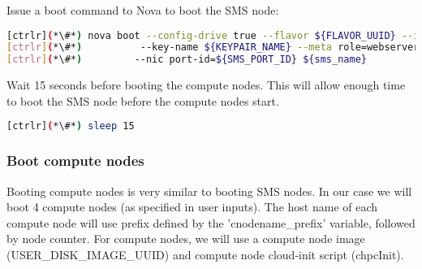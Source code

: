 	Issue a boot command to Nova to boot the SMS node:


\begin{lstlisting}[language=bash,keywords={}]
[ctrlr](*\#*) nova boot --config-drive true --flavor ${FLAVOR_UUID} --image ${SMS_DISK_IMAGE_UUID} \
[ctrlr](*\#*)          --key-name ${KEYPAIR_NAME} --meta role=webservers --user-data=$chpcSMSInit \
[ctrlr](*\#*)         --nic port-id=${SMS_PORT_ID} ${sms_name}
\end{lstlisting} 

	Wait 15 seconds before booting the compute nodes. This will allow enough time to boot the SMS node before the compute nodes start. 


\begin{lstlisting}[language=bash,keywords={}]
[ctrlr](*\#*) sleep 15
\end{lstlisting} 

\newpage
\subsubsection{Boot compute nodes}

	Booting compute nodes is very similar to booting SMS nodes. In our case we will boot 4 compute nodes (as specified in user inputs). The host name of each compute node will use prefix defined by the 'cnodename\_prefix' variable, followed by node counter. For compute nodes, we will use a compute node image (USER\_DISK\_IMAGE\_UUID) and compute node cloud-init script (chpcInit). 


